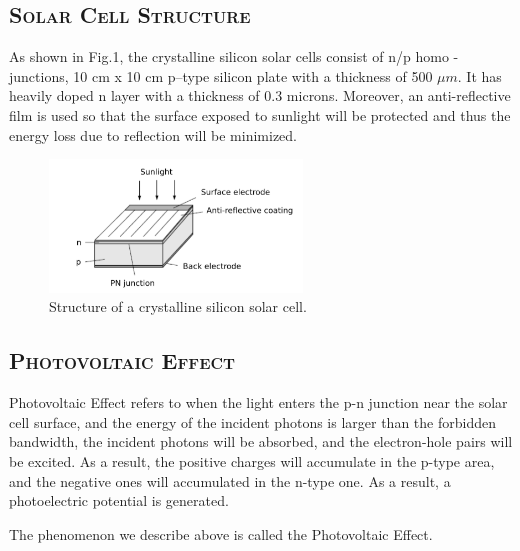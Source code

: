 \documentclass[a4paper,12pt]{article}
\begin{document}
\subsection{\textsc{Solar Cell Structure}}
As shown in Fig.1, the crystalline silicon solar cells consist of n/p homo - junctions, 10 cm x 10 cm p–type silicon plate with a thickness of 500 $\mu m$. It has heavily doped n layer with a thickness of 0.3 microns. Moreover, an anti-reflective film is used so that the surface exposed to sunlight will be protected and thus the energy loss due to reflection will be minimized.

\begin{figure}[htb] 
    \centering
    \includegraphics[width=0.6\textwidth]{Fig1} 
    \caption{Structure of a crystalline silicon solar cell.\cite{labmanual}} 
\end{figure}

\subsection{\textsc{Photovoltaic Effect}}
Photovoltaic Effect refers to when the light enters the p-n junction near the solar cell surface, and the energy of the incident photons is larger than the forbidden bandwidth, the incident photons will be absorbed, and the electron-hole pairs will be excited. As a result, the positive charges will accumulate in the p-type area, and the negative ones will accumulated in the n-type one. As a result, a photoelectric potential is generated.
\par The phenomenon we describe above is called the Photovoltaic Effect.
\end{document}
